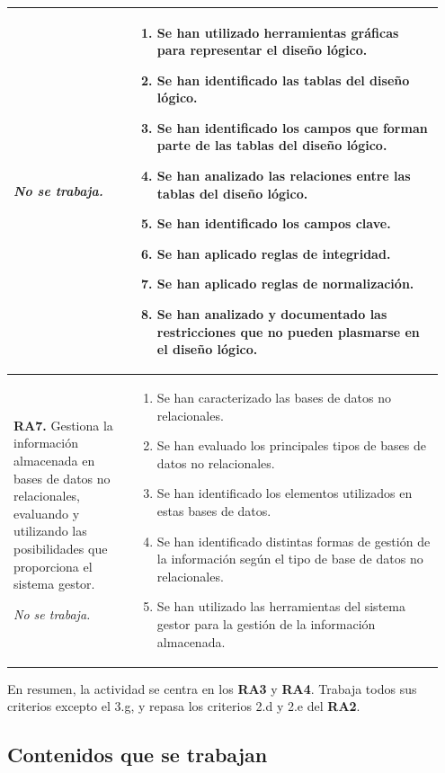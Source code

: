 \documentclass[11pt,a4paper]{article}
\begin{document}
\begin{longtable}{@{}p{0.27\linewidth}p{0.68\linewidth}@{}}
\smallskip\emph{No se trabaja.}
&
\begin{enumerate}[label=\alph*), leftmargin=*, nosep]
  \item Se han utilizado herramientas gráficas para representar el diseño lógico.
  \item Se han identificado las tablas del diseño lógico.
  \item Se han identificado los campos que forman parte de las tablas del diseño lógico.
  \item Se han analizado las relaciones entre las tablas del diseño lógico.
  \item Se han identificado los campos clave.
  \item Se han aplicado reglas de integridad.
  \item Se han aplicado reglas de normalización.
  \item Se han analizado y documentado las restricciones que no pueden plasmarse en el
        diseño lógico.
\end{enumerate} \\
\midrule
\textbf{RA7.} Gestiona la información almacenada en bases de datos no relacionales,
evaluando y utilizando las posibilidades que proporciona el sistema gestor.

\smallskip\emph{No se trabaja.}
&
\begin{enumerate}[label=\alph*), leftmargin=*, nosep]
  \item Se han caracterizado las bases de datos no relacionales.
  \item Se han evaluado los principales tipos de bases de datos no relacionales.
  \item Se han identificado los elementos utilizados en estas bases de datos.
  \item Se han identificado distintas formas de gestión de la información según el tipo
        de base de datos no relacionales.
  \item Se han utilizado las herramientas del sistema gestor para la gestión de la
        información almacenada.
\end{enumerate} \\
\end{longtable}

En resumen, la actividad se centra en los \textbf{RA3} y \textbf{RA4}. Trabaja todos sus
criterios excepto el 3.g, y repasa los criterios 2.d y 2.e del \textbf{RA2}.

\subsection{Contenidos que se trabajan}
\end{document}
